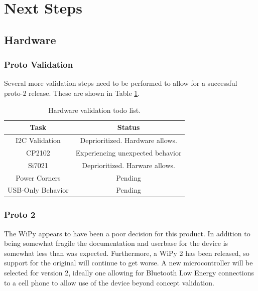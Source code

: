 \documentclass[11pt,oneside]{amsart}
\begin{document}
\section{Next Steps}
\subsection{Hardware}
\subsubsection{Proto Validation}
Several more validation steps need to be performed to allow for a successful proto-2 release. These are shown in Table \ref{tab:validationtodo}.
\begin{table}[htp]
\caption{Hardware validation todo list.}
\begin{center}
\begin{tabular}{|c|c|}
\hline
Task&Status\\
\hline\hline
I2C Validation& Deprioritized. Hardware allows.\\
\hline
CP2102 & Experiencing unexpected behavior\\
\hline
Si7021 & Deprioritized. Harware allows.\\
\hline
Power Corners & Pending\\
\hline
USB-Only Behavior & Pending\\
\hline
\end{tabular}
\end{center}
\label{tab:validationtodo}
\end{table}%
\subsubsection{Proto 2}
The WiPy appears to have been a poor decision for this product. In addition to being somewhat fragile the documentation and userbase for the device is somewhat less than was expected. Furthermore, a WiPy 2 has been released, so support for the original will continue to get worse.
A new microcontroller will be selected for version 2, ideally one allowing for Bluetooth Low Energy connections to a cell phone to allow use of the device beyond concept validation.
\end{document}
